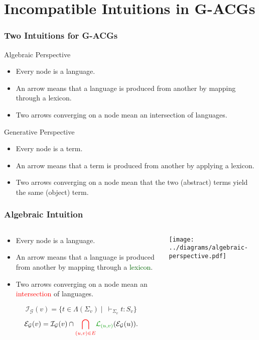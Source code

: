 \documentclass{beamer}
\begin{document}
\section{Incompatible Intuitions in G-ACGs}

\begin{frame}
  \frametitle{Two Intuitions for G-ACGs}

  \begin{block}{Algebraic Perspective}
    \begin{itemize}
    \item Every node is a language.
    \item An arrow means that a language is produced from another by
      mapping through a lexicon.
    \item Two arrows converging on a node mean an intersection of
      languages.
    \end{itemize}
  \end{block}
  \begin{block}{Generative Perspective}
    \begin{itemize}
    \item Every node is a term.
    \item An arrow means that a term is produced from another by
      applying a lexicon.
    \item Two arrows converging on a node mean that the two (abstract)
      terms yield the same (object) term.
    \end{itemize}
  \end{block}
\end{frame}


\begin{frame}
  \frametitle{Algebraic Intuition}

  \begin{columns}[c]
    \begin{column}{0.7\textwidth}
      \begin{itemize}
      \item Every node is a language.
      \item An arrow means that a language is produced from another by
        mapping through a \textcolor{darkgreen}{lexicon}.
      \item Two arrows converging on a node mean an
        \textcolor{red}{intersection} of languages.
      \end{itemize}

$$
\mathcal{I}_{\mathcal{G}}(v) = \{t \in \Lambda(\Sigma_v)
\mid\ \vdash_{\Sigma_v} t : S_v\}
$$
$$
\mathcal{E}_{\mathcal{G}}(v) = \mathcal{I}_{\mathcal{G}}(v) \cap
\textcolor{red}{\bigcap_{(u,v) \in E}}
\textcolor{darkgreen}{\mathcal{L}_{(u,v)}}(\mathcal{E}_{\mathcal{G}}(u)).
$$
    \end{column}
    \begin{column}{0.3\textwidth}
      \texttt{[image: ../diagrams/algebraic-perspective.pdf]}
    \end{column}
  \end{columns}

\end{frame}
\end{document}
